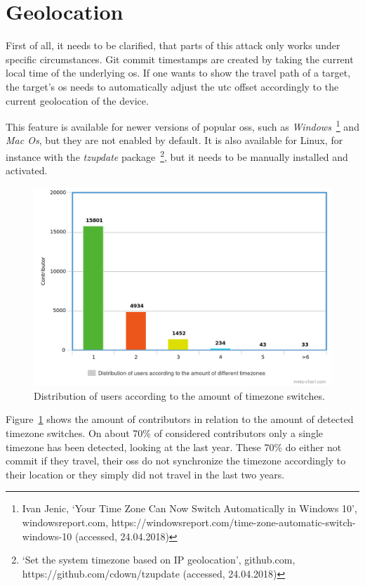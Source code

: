 \section{Geolocation}

First of all, it needs to be clarified, that parts of this attack only works under specific circumstances.
Git commit timestamps are created by taking the current local time of the underlying \ac{os}.
If one wants to show the travel path of a target, the target's \ac{os} needs to automatically adjust the \ac{utc} offset accordingly to the current geolocation of the device.

This feature is available for newer versions of popular \acp{os}, such as \emph{Windows}~\footnote{Ivan Jenic, `Your Time Zone Can Now Switch Automatically in Windows 10', windowsreport.com, https://windowsreport.com/time-zone-automatic-switch-windows-10 (accessed, 24.04.2018)}
and \emph{Mac Os}, but they are not enabled by default.
It is also available for Linux, for instance with the \emph{tzupdate} package~\footnote{`Set the system timezone based on IP geolocation', github.com, https://github.com/cdown/tzupdate (accessed, 24.04.2018)}, but it needs to be manually installed and activated.

\begin{figure}[H]
    \includegraphics[scale=0.40]{./graphs/analysis/timezone-user-distribution}
    \centering
    \caption{Distribution of users according to the amount of timezone switches.}\label{fig:timezone-distribution}
\end{figure}

Figure~\ref{fig:timezone-distribution} shows the amount of contributors in relation to the amount of detected timezone switches.
On about 70\% of considered contributors only a single timezone has been detected, looking at the last year.
These 70\% do either not commit if they travel, their \acp{os} do not synchronize the timezone accordingly to their location or they simply did not travel in the last two years.


